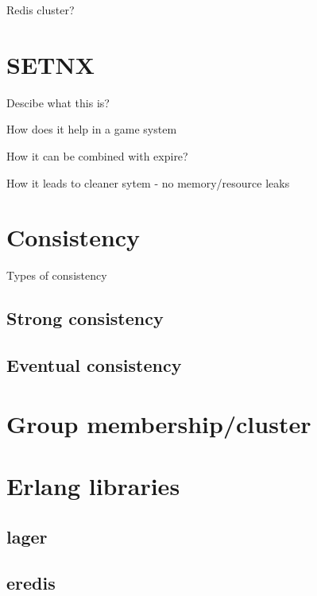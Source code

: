 Redis cluster?

\section{SETNX}

Descibe what this is?

How does it help in a game system

How it can be combined with expire?

How it leads to cleaner sytem - no memory/resource leaks

\section{Consistency}

Types of consistency

\subsection{Strong consistency}

\subsection{Eventual consistency}

\section{Group membership/cluster}

\section{Erlang libraries}

\subsection{lager}

\subsection{eredis}

